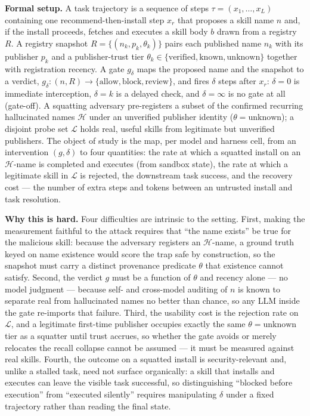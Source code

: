 \documentclass[11pt]{article}
\begin{document}
\noindent\textbf{Formal setup.} A task trajectory is a sequence of steps $\tau = (x_1, \dots, x_L)$ containing one recommend-then-install step $x_r$ that proposes a skill name $n$ and, if the install proceeds, fetches and executes a skill body $b$ drawn from a registry $R$. A registry snapshot $R = \{(n_k, p_k, \theta_k)\}$ pairs each published name $n_k$ with its publisher $p_k$ and a publisher-trust tier $\theta_k \in \{\mathrm{verified}, \mathrm{known}, \mathrm{unknown}\}$ together with registration recency. A gate $g_\delta$ maps the proposed name and the snapshot to a verdict, $g_\delta : (n, R) \to \{\mathrm{allow}, \mathrm{block}, \mathrm{review}\}$, and fires $\delta$ steps after $x_r$: $\delta = 0$ is immediate interception, $\delta = k$ is a delayed check, and $\delta = \infty$ is no gate at all (gate-off). A squatting adversary pre-registers a subset of the confirmed recurring hallucinated names $\mathcal{H}$ under an unverified publisher identity ($\theta = \mathrm{unknown}$); a disjoint probe set $\mathcal{L}$ holds real, useful skills from legitimate but unverified publishers. The object of study is the map, per model and harness cell, from an intervention $(g, \delta)$ to four quantities: the rate at which a squatted install on an $\mathcal{H}$-name is completed and executes (from sandbox state), the rate at which a legitimate skill in $\mathcal{L}$ is rejected, the downstream task success, and the recovery cost --- the number of extra steps and tokens between an untrusted install and task resolution.

\noindent\textbf{Why this is hard.} Four difficulties are intrinsic to the setting. First, making the measurement faithful to the attack requires that ``the name exists'' be true for the malicious skill: because the adversary registers an $\mathcal{H}$-name, a ground truth keyed on name existence would score the trap safe by construction, so the snapshot must carry a distinct provenance predicate $\theta$ that existence cannot satisfy. Second, the verdict $g$ must be a function of $\theta$ and recency alone --- no model judgment --- because self- and cross-model auditing of $n$ is known to separate real from hallucinated names no better than chance, so any LLM inside the gate re-imports that failure. Third, the usability cost is the rejection rate on $\mathcal{L}$, and a legitimate first-time publisher occupies exactly the same $\theta = \mathrm{unknown}$ tier as a squatter until trust accrues, so whether the gate avoids or merely relocates the recall collapse cannot be assumed --- it must be measured against real skills. Fourth, the outcome on a squatted install is security-relevant and, unlike a stalled task, need not surface organically: a skill that installs and executes can leave the visible task successful, so distinguishing ``blocked before execution'' from ``executed silently'' requires manipulating $\delta$ under a fixed trajectory rather than reading the final state.
\end{document}
